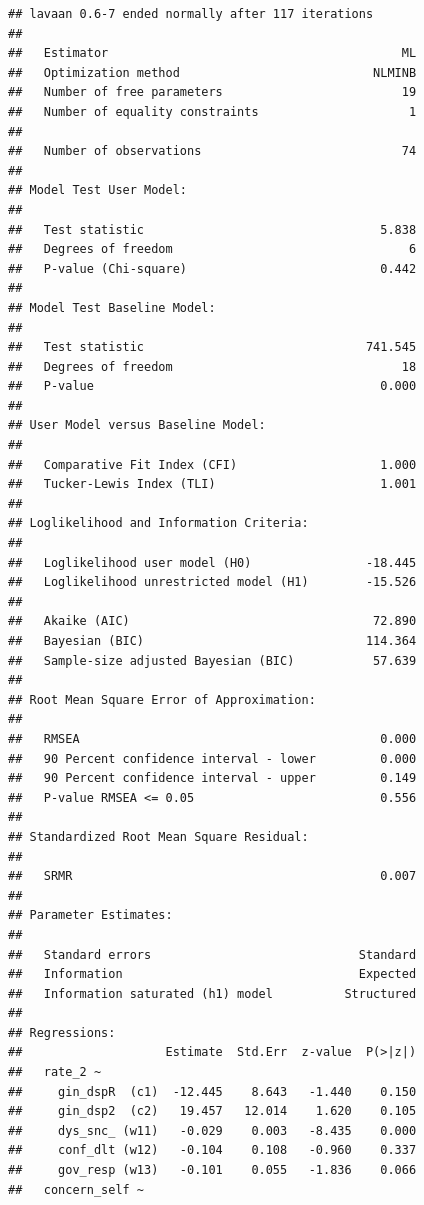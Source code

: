 \documentclass[
]{article}
\begin{document}
\begin{verbatim}
## lavaan 0.6-7 ended normally after 117 iterations
## 
##   Estimator                                         ML
##   Optimization method                           NLMINB
##   Number of free parameters                         19
##   Number of equality constraints                     1
##                                                       
##   Number of observations                            74
##                                                       
## Model Test User Model:
##                                                       
##   Test statistic                                 5.838
##   Degrees of freedom                                 6
##   P-value (Chi-square)                           0.442
## 
## Model Test Baseline Model:
## 
##   Test statistic                               741.545
##   Degrees of freedom                                18
##   P-value                                        0.000
## 
## User Model versus Baseline Model:
## 
##   Comparative Fit Index (CFI)                    1.000
##   Tucker-Lewis Index (TLI)                       1.001
## 
## Loglikelihood and Information Criteria:
## 
##   Loglikelihood user model (H0)                -18.445
##   Loglikelihood unrestricted model (H1)        -15.526
##                                                       
##   Akaike (AIC)                                  72.890
##   Bayesian (BIC)                               114.364
##   Sample-size adjusted Bayesian (BIC)           57.639
## 
## Root Mean Square Error of Approximation:
## 
##   RMSEA                                          0.000
##   90 Percent confidence interval - lower         0.000
##   90 Percent confidence interval - upper         0.149
##   P-value RMSEA <= 0.05                          0.556
## 
## Standardized Root Mean Square Residual:
## 
##   SRMR                                           0.007
## 
## Parameter Estimates:
## 
##   Standard errors                             Standard
##   Information                                 Expected
##   Information saturated (h1) model          Structured
## 
## Regressions:
##                    Estimate  Std.Err  z-value  P(>|z|)
##   rate_2 ~                                            
##     gin_dspR  (c1)  -12.445    8.643   -1.440    0.150
##     gin_dsp2  (c2)   19.457   12.014    1.620    0.105
##     dys_snc_ (w11)   -0.029    0.003   -8.435    0.000
##     conf_dlt (w12)   -0.104    0.108   -0.960    0.337
##     gov_resp (w13)   -0.101    0.055   -1.836    0.066
##   concern_self ~                                      

\end{verbatim}
\end{document}
